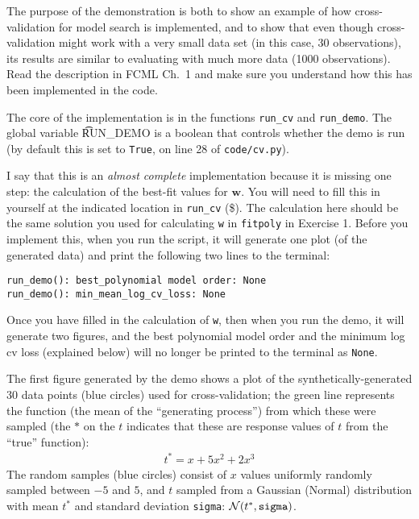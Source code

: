 \documentclass[10pt]{article}
\begin{document}
\begin{itemize}
The purpose of the demonstration is both to show an example of how
cross-validation for model search is implemented, and to show that even though
cross-validation might work with a very small data set (in this case, 30
observations), its results are similar to evaluating with much more data
(1000 observations). Read the description in FCML Ch.~1 and make sure you understand how this has been implemented in the code.

The core of the implementation is in the functions {\tt run\_cv} and {\tt run\_demo}. The global variable {\t RUN\_DEMO} is a boolean that controls whether the demo is run (by default this is set to {\tt True}, on line 28 of {\tt code/cv.py}).

I say that this is an {\em almost complete} implementation because it is missing one step: the calculation of the best-fit values for $\mathbf{w}$. You will need to fill this in yourself at the indicated location in {\tt run\_cv} (\$). The calculation here should be the same solution you used for calculating {\tt w} in {\tt fitpoly} in Exercise 1. Before you implement this, when you run the script, it will generate one plot (of the generated data) and print the following two lines to the terminal:
\begin{verbatim}
run_demo(): best_polynomial model order: None
run_demo(): min_mean_log_cv_loss: None
\end{verbatim}

Once you have filled in the calculation of {\tt w}, then when you run the demo, it will generate two figures, and the best polynomial model order and the minimum log cv loss (explained below) will no longer be printed to the terminal as {\tt None}.

The first figure generated by the demo shows a plot of the synthetically-generated $30$ data points (blue circles) used for cross-validation; the green line represents the function (the mean of the ``generating process'') from which these were sampled (the $*$ on the $t$ indicates that these are response values of $t$ from the ``true'' function):
\begin{eqnarray*}
t^* = x + 5x^2 + 2x^3
\end{eqnarray*}
The random samples (blue circles) consist of $x$ values uniformly randomly sampled between $-5$ and $5$, and $t$ sampled from a Gaussian (Normal) distribution with mean $t^*$ and standard deviation {\tt sigma}: $\mathcal{N}(t^*, \mathrm{\tt sigma})$.


\end{itemize}
\end{document}
